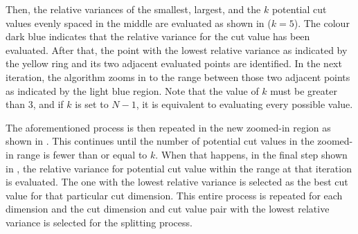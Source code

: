 Then, the relative variances of the smallest, largest, and the $k$ potential cut values evenly spaced in the middle are evaluated as shown in  ($k=5$). The colour dark blue indicates that the relative variance for the cut value has been evaluated. After that, the point with the lowest relative variance as indicated by the yellow ring and its two adjacent evaluated points are identified. In the next iteration, the algorithm zooms in to the range between those two adjacent points as indicated by the light blue region. Note that the value of $k$ must be greater than 3, and if $k$ is set to $N-1$, it is equivalent to evaluating every possible value. 

The aforementioned process is then repeated in the new zoomed-in region as shown in . This continues until the number of potential cut values in the zoomed-in range is fewer than or equal to $k$. When that happens, in the final step shown in , the relative variance for potential cut value within the range at that iteration is evaluated. The one with the lowest relative variance is selected as the best cut value for that particular cut dimension. 
This entire process is repeated for each dimension and the cut dimension and cut value pair with the lowest relative variance is selected for the splitting process.


